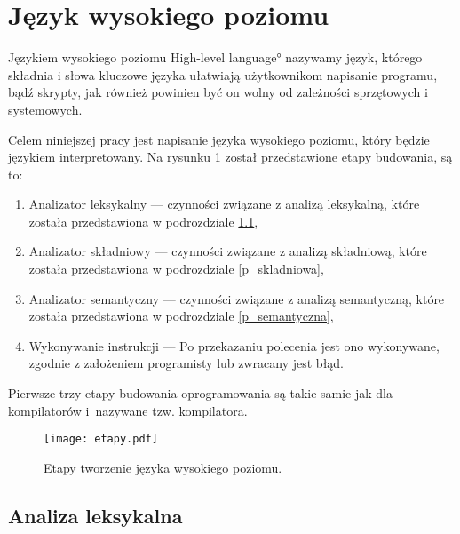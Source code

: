 \section{Język wysokiego poziomu }

Językiem wysokiego poziomu \ang{High-level language} nazywamy język, 
którego składnia i słowa kluczowe języka ułatwiają użytkownikom  napisanie programu, bądź skrypty,
jak również powinien być on wolny od zależności sprzętowych i systemowych.

Celem niniejszej pracy jest napisanie języka wysokiego poziomu, który będzie językiem interpretowany.
Na rysunku \ref{fig:etapy} został przedstawione etapy budowania, są to:
\begin{enumerate}
 \item Analizator leksykalny  --- czynności związane z analizą leksykalną, które  została przedstawiona w podrozdziale  \ref{p_leksykalna},
 \item Analizator składniowy  --- czynności związane z analizą składniową, które  została przedstawiona w podrozdziale  \ref{p_skladniowa},
 \item Analizator semantyczny --- czynności związane z analizą semantyczną, które  została przedstawiona w podrozdziale \ref{p_semantyczna},
 \item Wykonywanie instrukcji --- Po przekazaniu polecenia jest ono wykonywane, zgodnie z założeniem programisty lub zwracany jest błąd.
\end{enumerate}
Pierwsze trzy etapy budowania oprogramowania są takie samie jak dla kompilatorów i~nazywane tzw. kompilatora.\cite{aho}

 \begin{center}
\begin{figure}[H]
  \begin{center}
    \texttt{[image: etapy.pdf]}
  \end{center}
  \caption{Etapy tworzenie języka wysokiego poziomu. }
    \label{fig:etapy}
\end{figure}
\end{center}


\subsection{Analiza leksykalna} \label{p_leksykalna}

